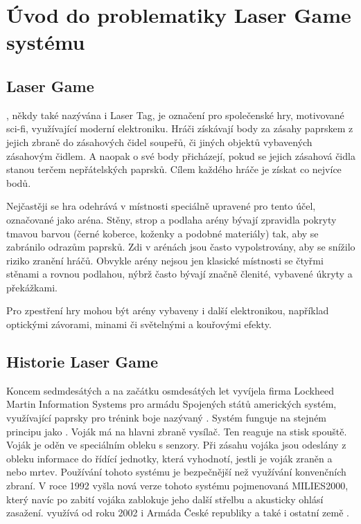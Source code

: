 \chapter{Úvod do problematiky Laser Game systému}

\section{Laser Game}
, někdy také nazývána i Laser Tag, je označení pro společenské hry, motivované sci-fi, využívající moderní elektroniku. Hráči získávají body za zásahy  paprskem z jejich zbraně do zásahových čidel soupeřů, či jiných objektů vybavených zásahovým čidlem. A naopak o své body přicházejí, pokud se jejich zásahová čidla stanou terčem nepřátelských  paprsků. Cílem každého hráče je získat co nejvíce bodů.

Nejčastěji se hra odehrává v místnosti speciálně upravené pro tento účel, označované jako aréna. Stěny, strop a podlaha arény bývají zpravidla pokryty tmavou barvou (černé koberce, koženky a podobné materiály) tak, aby se zabránilo odrazům  paprsků. Zdi v arénách jsou často vypolstrovány, aby se snížilo riziko zranění hráčů. Obvykle arény nejsou jen klasické místnosti se čtyřmi stěnami a rovnou podlahou, nýbrž často bývají značně členité, vybavené úkryty a překážkami.

Pro zpestření hry mohou být arény vybaveny i další elektronikou, například optickými závorami, minami či světelnými a kouřovými efekty.



\section{Historie Laser Game}
Koncem sedmdesátých a na začátku osmdesátých let vyvíjela firma Lockheed Martin Information Systems pro armádu Spojených států amerických systém, využívající  paprsky pro trénink boje nazývaný . Systém funguje na stejném principu jako . Voják má na hlavni zbraně  vysílač. Ten reaguje na stisk spouště. Voják je oděn ve speciálním obleku s  senzory. Při zásahu vojáka jsou odeslány z obleku informace do řídící jednotky, která vyhodnotí, jestli je voják zraněn a nebo mrtev. Používání tohoto systému je bezpečnější než využívání konvenčních zbraní. V roce 1992 vyšla nová verze tohoto systému pojmenovaná MILIES2000, který navíc po zabití vojáka zablokuje jeho další střelbu a akusticky ohlásí zasažení.  využívá od roku 2002 i Armáda České republiky a také i ostatní země .

